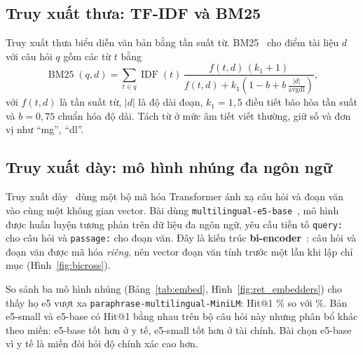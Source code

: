 \subsection{Truy xuất thưa: TF-IDF và BM25}
Truy xuất thưa biểu diễn văn bản bằng tần suất từ. BM25~\cite{robertson2009bm25} cho điểm tài liệu $d$ với câu hỏi
$q$ gồm các từ $t$ bằng
\begin{equation}
  \operatorname{BM25}(q,d) = \sum_{t \in q} \operatorname{IDF}(t)\,
  \frac{f(t,d)\,(k_1+1)}{f(t,d) + k_1\left(1 - b + b\,\frac{|d|}{\operatorname{avgdl}}\right)},
\end{equation}
với $f(t,d)$ là tần suất từ, $|d|$ là độ dài đoạn, $k_1 = 1{,}5$ điều tiết bão hòa tần suất và $b = 0{,}75$ chuẩn
hóa độ dài. Tách từ ở mức âm tiết viết thường, giữ số và đơn vị như ``mg'', ``dl''.


\subsection{Truy xuất dày: mô hình nhúng đa ngôn ngữ}
Truy xuất dày~\cite{karpukhin2020dpr} dùng một bộ mã hóa Transformer ánh xạ câu hỏi và đoạn văn vào cùng một không
gian vector. Bài dùng \texttt{multilingual-e5-base}~\cite{wang2024me5}, mô hình được huấn luyện tương phản trên dữ
liệu đa ngôn ngữ, yêu cầu tiền tố \texttt{query:} cho câu hỏi và \texttt{passage:} cho đoạn văn. Đây là kiến trúc
\textbf{bi-encoder}~\cite{reimers2019sbert}: câu hỏi và đoạn văn được mã hóa \emph{riêng}, nên vector đoạn văn tính trước một lần khi lập
chỉ mục (Hình~\ref{fig:bicross}).


So sánh ba mô hình nhúng (Bảng~\ref{tab:embed}, Hình~\ref{fig:ret_embedders}) cho thấy họ e5 vượt xa
\texttt{paraphrase-multilingual-MiniLM}: Hit@1 \% so với
\%. Bản e5-small và e5-base có Hit@1 bằng nhau trên bộ câu hỏi này nhưng phân
bổ khác theo miền: e5-base tốt hơn ở y tế, e5-small tốt hơn ở tài chính. Bài chọn e5-base vì y tế là miền đòi hỏi
độ chính xác cao hơn.



